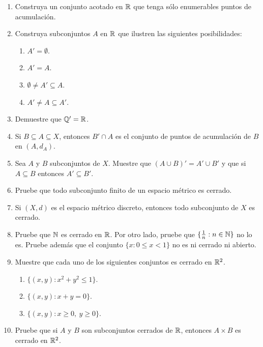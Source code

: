 \begin{enumerate}
    \item Construya un conjunto acotado en $\mathbb{R}$ que tenga sólo enumerables puntos de acumulación.
    
    \item Construya subconjuntos $A$ en $\mathbb{R}$ que ilustren las siguientes posibilidades:
    \begin{enumerate}
        \item[a)] $A' = \emptyset$.
        \item[b)] $A' = A$.
        \item[c)] $\emptyset \neq A' \subseteq A$.
        \item[d)] $A' \neq A \subseteq A'$.
    \end{enumerate}
    
    \item Demuestre que $\mathbb{Q}' = \mathbb{R}$.
    
    \item Si $B \subseteq A \subseteq X$, entonces $B' \cap A$ es el conjunto de puntos de acumulación de $B$ en $(A, d_A)$.
    
    \item Sea $A$ y $B$ subconjuntos de $X$. Muestre que $(A \cup B)' = A' \cup B'$ y que si $A \subseteq B$ entonces $A' \subseteq B'$.
    
    \item Pruebe que todo subconjunto finito de un espacio métrico es cerrado.
    
    \item Si $(X, d)$ es el espacio métrico discreto, entonces todo subconjunto de $X$ es cerrado.
    
    \item Pruebe que $\mathbb{N}$ es cerrado en $\mathbb{R}$. Por otro lado, pruebe que $\{\frac{1}{n} : n \in \mathbb{N}\}$ no lo es. Pruebe además que el conjunto $\{x : 0 \leq x < 1\}$ no es ni cerrado ni abierto.
    
    \item Muestre que cada uno de los siguientes conjuntos es cerrado en $\mathbb{R}^2$.
    \begin{enumerate}
        \item[a)] $\{(x, y) : x^2 + y^2 \leq 1\}$.
        \item[b)] $\{(x, y) : x + y = 0\}$.
        \item[c)] $\{(x, y) : x \geq 0, \ y \geq 0\}$.
    \end{enumerate}
    
    \item Pruebe que si $A$ y $B$ son subconjuntos cerrados de $\mathbb{R}$, entonces $A \times B$ es cerrado en $\mathbb{R}^2$.
    

\end{enumerate}
